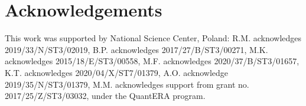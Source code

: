 \documentclass[
 print,
 amsmath,amssymb,
 aps,
]{revtex4-2}
\begin{document}
	\section{Acknowledgements}
    This work was supported by National Science Center, Poland:  
    R.M. acknowledges 2019/33/N/ST3/02019, 
    B.P. acknowledges 2017/27/B/ST3/00271, 
    M.K. acknowledges 2015/18/E/ST3/00558, 
    M.F. acknowledges 2020/37/B/ST3/01657, 
    K.T. acknowledges 2020/04/X/ST7/01379,
    A.O. acknowledge 2019/35/N/ST3/01379,
    M.M. acknowledges support from grant no. 2017/25/Z/ST3/03032, under the QuantERA program.
	
	
	
	
\end{document}
